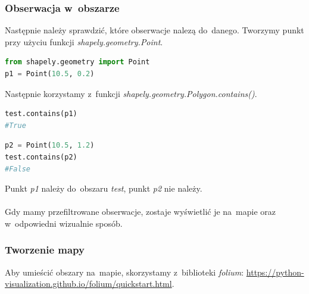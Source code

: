 \documentclass{article}
\begin{document}
 \subsubsection{Obserwacja w~obszarze}
Następnie należy sprawdzić, które obserwacje nalezą do~danego. Tworzymy punkt przy użyciu funkcji
\textit{shapely.geometry.Point}.
\begin{lstlisting}[language=Python, caption=Dodanie obszaru]
from shapely.geometry import Point
p1 = Point(10.5, 0.2)
\end{lstlisting}
Następnie korzystamy z~funkcji \textit{shapely.geometry.Polygon.contains()}.
\begin{lstlisting}[language=Python, caption=Dodanie obszaru]
test.contains(p1)
#True
\end{lstlisting}
\begin{lstlisting}[language=Python, caption=Dodanie obszaru]
p2 = Point(10.5, 1.2)
test.contains(p2)
#False
\end{lstlisting}
Punkt \textit{p1} należy do~obszaru \textit{test}, punkt \textit{p2} nie należy.
\\\\Gdy mamy przefiltrowane obserwacje, zostaje wyświetlić je na~mapie oraz w~odpowiedni wizualnie sposób.

\subsubsection{Tworzenie mapy}
Aby umieścić obszary na~mapie, skorzystamy z~biblioteki \textit{folium}: \url{https://python-visualization.github.io/folium/quickstart.html}.
\end{document}
